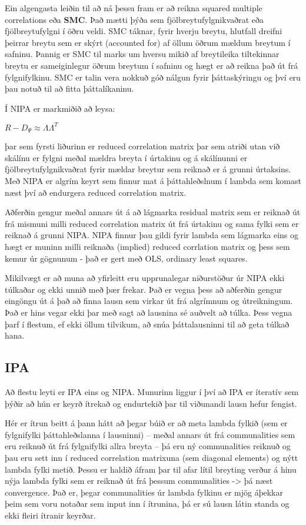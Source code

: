 \documentclass[]{book}
\begin{document}
Ein algengasta leiðin til að ná þessu fram er að reikna squared multiple correlations eða \textbf{SMC}. Það mætti þýða sem fjölbreytufylgnikvaðrat eða fjölbreytufylgni í öðru veldi. SMC táknar, fyrir hverju breytu, hlutfall dreifni þeirrar breytu sem er skýrt (accounted for) af öllum öðrum mældum breytum í safninu. Þannig er SMC til marks um hversu mikið af breytileika tiltekinnar breytu er sameiginlegur öðrum breytum í safninu og hægt er að reikna það út frá fylgnifylkinu. SMC er talin vera nokkuð góð nálgun fyrir þáttaskýringu og því eru þau notuð til að fitta þáttalíkaninu.

Í NIPA er markmiðið að leysa:

\(R-D_{\Psi} \approx \Lambda \Lambda^{T}\)

þar sem fyrsti liðurinn er reduced correlation matrix þar sem atriði utan við skálínu er fylgni meðal mældra breyta í úrtakinu og á skálínunni er fjölbreytufylgnikvaðrat fyrir mældar breytur sem reiknað er á grunni úrtaksins. Með NIPA er algrím keyrt sem finnur mat á þáttahleðslnum í lambda sem komast næst því að endurgera reduced correlation matrix.

Aðferðin gengur meðal annars út á að lágmarka residual matrix sem er reiknað út frá mismuni milli reduced correlation matrix út frá úrtakinu og sama fylki sem er reiknað á grunni NIPA. NIPA finnur þau gildi fyrir lambda sem lágmarka eins og hægt er muninn milli reiknaða (implied) reduced corrlation matrix og þess sem kemur úr gögnunum - það er gert með OLS, ordinary least squares.

Mikilvægt er að muna að yfirleitt eru upprunalegar niðurstöður úr NIPA ekki túlkaðar og ekki unnið með þær frekar. Það er vegna þess að aðferðin gengur eingöngu út á það að finna lausn sem virkar út frá algrímnum og útreikningum. Það er hins vegar ekki þar með sagt að lausnina sé auðvelt að túlka. Þess vegna þarf í flestum, ef ekki öllum tilvikum, að snúa þáttalausninni til að geta túlkað hana.

\hypertarget{ipa}{%
\subsection{IPA}\label{ipa}}

Að flestu leyti er IPA eins og NIPA. Munurinn liggur í því að IPA er íteratív sem þýðir að hún er keyrð ítrekað og endurtekið þar til viðunandi lausn hefur fengist.

Hér er ítrun beitt á þann hátt að þegar búið er að meta lambda fylkið (sem er fylgnifylki þáttahleðslanna í lausninni) -- meðal annars út frá communalities sem eru reiknuð út frá fylgnifylki allra breyta -- þá eru ný communalities reiknuð og þau eru sett inn í reduced correlation matrixuna (sem diagonal elements) og nýtt lambda fylki metið. Þessu er haldið áfram þar til afar lítil breyting verður á hinu nýja lambda fylki sem er reiknað út frá þessum communalities -\textgreater{} þá næst convergence. Það er, þegar communalities úr lambda fylkinu er mjög áþekkar þeim sem voru notaðar sem input inn í ítrunina, þá er sú lausn látin standa og ekki fleiri ítranir keyrðar.
\end{document}
